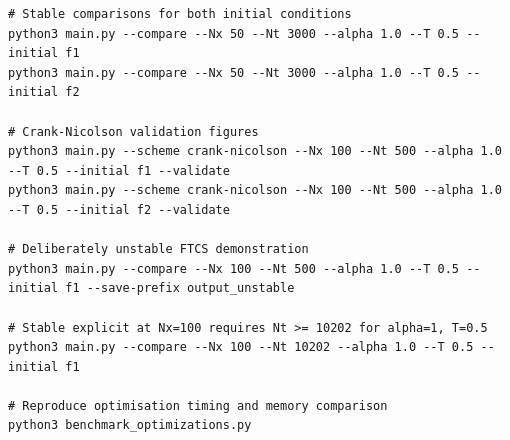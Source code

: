 \documentclass[11pt,a4paper]{article}
\begin{document}
\begin{verbatim}
# Stable comparisons for both initial conditions
python3 main.py --compare --Nx 50 --Nt 3000 --alpha 1.0 --T 0.5 --initial f1
python3 main.py --compare --Nx 50 --Nt 3000 --alpha 1.0 --T 0.5 --initial f2

# Crank-Nicolson validation figures
python3 main.py --scheme crank-nicolson --Nx 100 --Nt 500 --alpha 1.0 --T 0.5 --initial f1 --validate
python3 main.py --scheme crank-nicolson --Nx 100 --Nt 500 --alpha 1.0 --T 0.5 --initial f2 --validate

# Deliberately unstable FTCS demonstration
python3 main.py --compare --Nx 100 --Nt 500 --alpha 1.0 --T 0.5 --initial f1 --save-prefix output_unstable

# Stable explicit at Nx=100 requires Nt >= 10202 for alpha=1, T=0.5
python3 main.py --compare --Nx 100 --Nt 10202 --alpha 1.0 --T 0.5 --initial f1

# Reproduce optimisation timing and memory comparison
python3 benchmark_optimizations.py
\end{verbatim}
\end{document}
